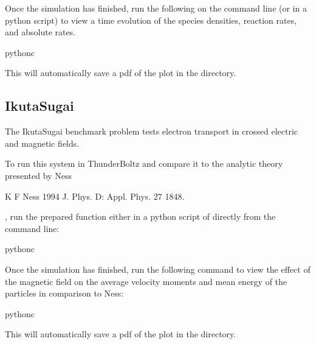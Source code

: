 \documentclass[letterpaper,10pt,english,openany,oneside]{sphinxmanual}
\begin{document}
\sphinxAtStartPar
Once the simulation has finished, run the following on the command line
(or in a python script) to view a time evolution of the species densities,
reaction rates, and absolute rates.

\begin{sphinxVerbatim}[commandchars=\\\{\}]
python\PYGZhy{}c
\end{sphinxVerbatim}

\sphinxAtStartPar
This will automatically save a pdf of the plot in the 
directory.


\subsection{Ikuta\sphinxhyphen{}Sugai}
\label{\detokenize{bm:ikuta-sugai}}
\sphinxAtStartPar
The Ikuta\sphinxhyphen{}Sugai benchmark problem tests electron transport
in crossed electric and magnetic fields.

\sphinxAtStartPar
To run this system in ThunderBoltz and compare it to the analytic
theory presented by Ness %
\begin{footnote}[2]\sphinxAtStartFootnote
K F Ness 1994 J. Phys. D: Appl. Phys. 27 1848.
%
\end{footnote}, run the prepared function either in a python
script of directly from the command line:

\begin{sphinxVerbatim}[commandchars=\\\{\}]
python\PYGZhy{}c
\end{sphinxVerbatim}

\sphinxAtStartPar
Once the simulation has finished, run the following command to view
the effect of the magnetic field on the average velocity moments
and mean energy of the particles in comparison to Ness:

\begin{sphinxVerbatim}[commandchars=\\\{\}]
python\PYGZhy{}c
\end{sphinxVerbatim}

\sphinxAtStartPar
This will automatically save a pdf of the plot in the 
directory.
\end{document}
